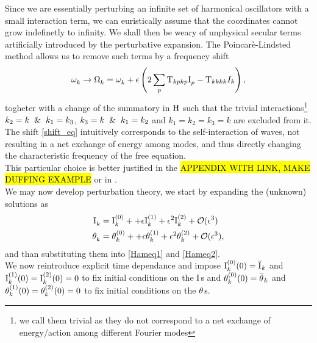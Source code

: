 Since we are essentially perturbing an infinite set of harmonical oscillators with a small interaction term, we can euristically assume that
the coordinates cannot grow indefinetly to infinity. We shall then be weary of unphysical secular terms artificially introduced by the perturbative
expansion. The Poincarè-Lindsted method allows us to remove such terms by a frequency shift
\begin{equation}
    \omega^{}_k \rightarrow \Omega^{}_k = \omega^{}_k + \epsilon \left(2\sum_p \mathrm{T}_{kpkp}\mathrm{I}^{}_p - \mathrm{T}_{kkkk}I_k \right),
    \label{shift_eq}
\end{equation}   
togheter with a change of the summatory in $\mathrm{H}$ such that the trivial interactions\footnote{
    we call them trivial as they do not correspond to a net exchange of energy/action among different Fourier modes
} $k_2=k \hspace{2mm}\&\hspace{2mm} k_1 = k_3$, $k_3=k \hspace{2mm}\& \hspace{2mm}k_1=k_2$ and $k_1=k_2=k_3=k$ are excluded from it. \\
The shift \eqref{shift_eq} intuitively corresponds to the self-interaction of waves, not resulting in a net exchange of energy among modes, and thus directly changing 
the characteristic frequency of the free equation. \\ 
This particular choice is better justified in the \hl{APPENDIX WITH LINK, MAKE DUFFING EXAMPLE} or in \cite{Nazarenko2011}. \\

We may now develop perturbation theory, we start by expanding the (unknown) solutions as
\begin{align}
    \mathrm{I}^{}_k &= \mathrm{I}^{(0)}_k +  + \epsilon \mathrm{I}^{(1)}_k + \epsilon^2 \mathrm{I}^{(2)}_k + \mathcal{O}(\epsilon^3) \\
    \theta^{}_k &= \theta^{(0)}_k +  + \epsilon \theta^{(1)}_k + \epsilon^2 \theta^{(2)}_k + \mathcal{O}(\epsilon^3),
\end{align}
and than substituting them into \eqref{Hameq1} and \eqref{Hameq2}. \\
We now reintroduce explicit time dependance and impose $\mathrm{I}^{(0)}_k(0) = \bar{\mathrm{I}^{}}_k$ and $\mathrm{I}^{(1)}_k(0) = \mathrm{I}^{(2)}_k(0) = 0$ to fix initial conditions on the $\mathrm{I}^{}$s and 
$\theta^{(0)}_k(0) = \bar{\theta^{}}_k$ and $\theta^{(1)}_k(0) = \theta^{(2)}_k(0) = 0$ to fix initial conditions on the $\theta^{}$s.\\

